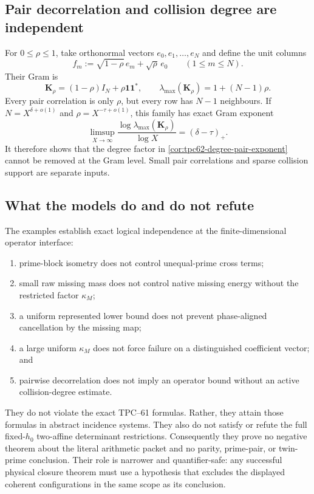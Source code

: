 \subsection{Pair decorrelation and collision degree are independent}

For \(0\le\rho\le1\), take orthonormal vectors
\(e_0,e_1,\ldots,e_N\) and define the unit columns
\begin{equation}
 f_m:=\sqrt{1-\rho}\,e_m+\sqrt\rho\,e_0
 \qquad(1\le m\le N).
 \label{eq:tpc62-equi-correlated-columns}
\end{equation}
Their Gram is
\begin{equation}
 \mathbf K_\rho=(1-\rho)I_N
 +\rho\boldsymbol 1\boldsymbol 1^*,
 \qquad
 \lambda_{\max}(\mathbf K_\rho)=1+(N-1)\rho.
 \label{eq:tpc62-equi-correlated-gram}
\end{equation}
Every pair correlation is only \(\rho\), but every row has \(N-1\)
neighbours.  If
\(N=X^{\delta+o(1)}\) and
\(\rho=X^{-\tau+o(1)}\), this family has exact Gram exponent
\begin{equation}
 \limsup_{X\to\infty}
 \frac{\log\lambda_{\max}(\mathbf K_\rho)}{\log X}
 = (\delta-\tau)_+.
 \label{eq:tpc62-equi-correlated-exponent}
\end{equation}
It therefore shows that the degree factor in
\cref{cor:tpc62-degree-pair-exponent} cannot be removed at the Gram level.
Small pair correlations and sparse collision support are separate inputs.

\subsection{What the models do and do not refute}

The examples establish exact logical independence at the finite-dimensional
operator interface:
\begin{enumerate}[label=\textup{(\roman*)},leftmargin=3em]
 \item prime-block isometry does not control unequal-prime cross terms;
 \item small raw missing mass does not control native missing energy without
       the restricted factor \(\kappa_M\);
 \item a uniform represented lower bound does not prevent phase-aligned
       cancellation by the missing map;
 \item a large uniform \(\kappa_M\) does not force failure on a distinguished
       coefficient vector; and
 \item pairwise decorrelation does not imply an operator bound without an
       active collision-degree estimate.
\end{enumerate}
They do not violate the exact TPC--61 formulas.  Rather, they attain those
formulas in abstract incidence systems.  They also do not satisfy or refute
the full fixed-\(h_0\) two-affine determinant restrictions.  Consequently
they prove no negative theorem about the literal arithmetic packet and no
parity, prime-pair, or twin-prime conclusion.  Their role is narrower and
quantifier-safe: any successful physical closure theorem must use a
hypothesis that excludes the displayed coherent configurations in the same
scope as its conclusion.
